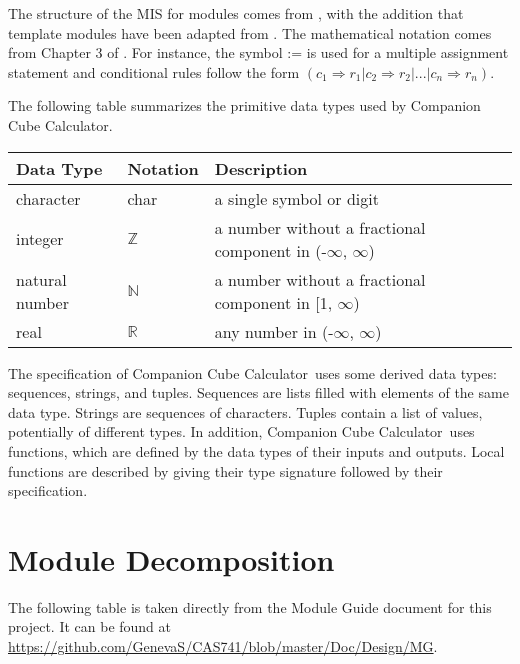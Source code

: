 \documentclass[12pt, titlepage]{article}
\newcommand{\progname}{Companion Cube Calculator}
\begin{document}

The structure of the MIS for modules comes from \citet{HoffmanAndStrooper1995},
with the addition that template modules have been adapted from
\cite{GhezziEtAl2003}.  The mathematical notation comes from Chapter 3 of
\citet{HoffmanAndStrooper1995}.  For instance, the symbol := is used for a
multiple assignment statement and conditional rules follow the form $(c_1
\Rightarrow r_1 | c_2 \Rightarrow r_2 | ... | c_n \Rightarrow r_n )$.

The following table summarizes the primitive data types used by \progname. 

\begin{center}
\renewcommand{\arraystretch}{1.2}
\noindent 
\begin{tabular}{l l p{7.5cm}} 
\toprule 
\textbf{Data Type} & \textbf{Notation} & \textbf{Description}\\ 
\midrule
character & char & a single symbol or digit\\
integer & $\mathbb{Z}$ & a number without a fractional component in (-$\infty$, $\infty$) \\
natural number & $\mathbb{N}$ & a number without a fractional component in [1, 
$\infty$) \\
real & $\mathbb{R}$ & any number in (-$\infty$, $\infty$)\\
\bottomrule
\end{tabular} 
\end{center}

\noindent
The specification of \progname \ uses some derived data types: sequences, strings, and
tuples. Sequences are lists filled with elements of the same data type. Strings
are sequences of characters. Tuples contain a list of values, potentially of
different types. In addition, \progname \ uses functions, which
are defined by the data types of their inputs and outputs. Local functions are
described by giving their type signature followed by their specification.

\section{Module Decomposition}

The following table is taken directly from the Module Guide document for this 
project. It can be found at 
\url{https://github.com/GenevaS/CAS741/blob/master/Doc/Design/MG}.
\end{document}
